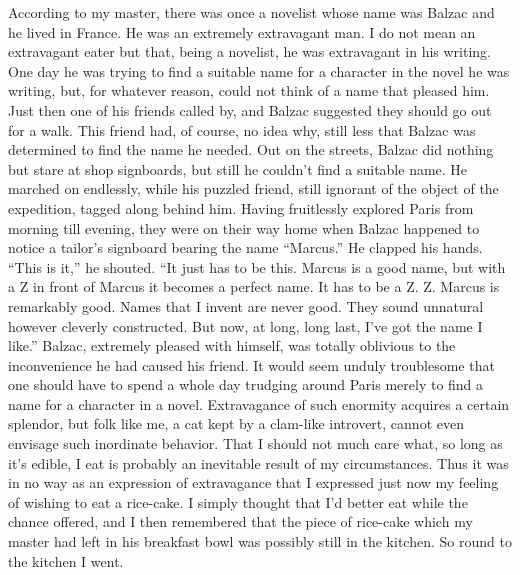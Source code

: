 \documentclass[12pt, openright]{book}
\begin{document}
According to my master, there was once a novelist whose name was Balzac
and he lived in France. He was an extremely extravagant man. I do not
mean an extravagant eater but that, being a novelist, he was extravagant
in his writing. One day he was trying to find a suitable name for a
character in the novel he was writing, but, for whatever reason, could
not think of a name that pleased him. Just then one of his friends
called by, and Balzac suggested they should go out for a walk. This
friend had, of course, no idea why, still less that Balzac was
determined to find the name he needed. Out on the streets, Balzac did
nothing but stare at shop signboards, but still he couldn't find a
suitable name. He marched on endlessly, while his puzzled friend, still
ignorant of the object of the expedition, tagged along behind him.
Having fruitlessly explored Paris from morning till evening, they were
on their way home when Balzac happened to notice a tailor's signboard
bearing the name ``Marcus.'' He clapped his hands. ``This is it,'' he
shouted. ``It just has to be this. Marcus is a good name, but with a Z
in front of Marcus it becomes a perfect name. It has to be a Z. Z.
Marcus is remarkably good. Names that I invent are never good. They
sound unnatural however cleverly constructed. But now, at long, long
last, I've got the name I like.'' Balzac, extremely pleased with
himself, was totally oblivious to the inconvenience he had caused his
friend. It would seem unduly troublesome that one should have to spend a
whole day trudging around Paris merely to find a name for a character in
a novel. Extravagance of such enormity acquires a certain splendor, but
folk like me, a cat kept by a clam-like introvert, cannot even envisage
such inordinate behavior. That I should not much care what, so long as
it's edible, I eat is probably an inevitable result of my circumstances.
Thus it was in no way as an expression of extravagance that I expressed
just now my feeling of wishing to eat a rice-cake. I simply thought that
I'd better eat while the chance offered, and I then remembered that the
piece of rice-cake which my master had left in his breakfast bowl was
possibly still in the kitchen. So round to the kitchen I went.
\end{document}
